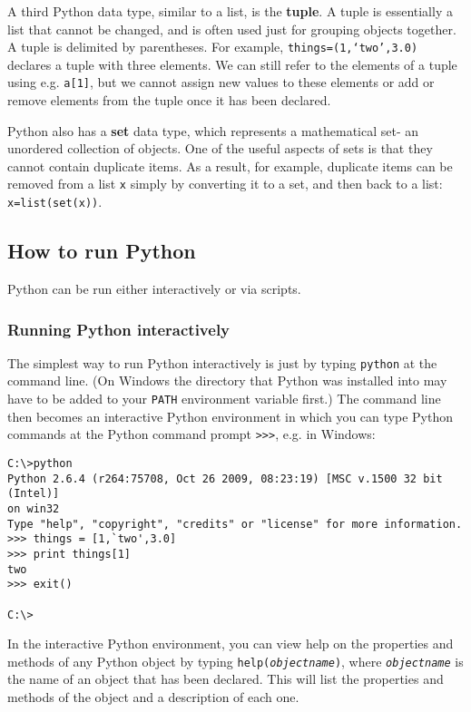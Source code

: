 A third Python data type, similar to a list, is the \textbf{tuple}.  A tuple is essentially a list that cannot be changed, and is often used just for grouping objects together.  A tuple is delimited by parentheses.  For example, \texttt{things=(1,`two',3.0)} declares a tuple with three elements.  We can still refer to the elements of a tuple using e.g. \texttt{a[1]}, but we cannot assign new values to these elements or add or remove elements from the tuple once it has been declared.

Python also has a \textbf{set} data type, which represents a mathematical set- an unordered collection of objects.  One of the useful aspects of sets is that they cannot contain duplicate items.  As a result, for example, duplicate items can be removed from a list \texttt{x} simply by converting it to a set, and then back to a list: \texttt{x=list(set(x))}.

\subsection{How to run Python}

Python can be run either interactively or via scripts.

\subsubsection{Running Python interactively}
\label{python_interactive}

The simplest way to run Python interactively is just by typing \texttt{python} at the command line.  (On Windows the directory that Python was installed into may have to be added to your \texttt{PATH} environment variable first.) The command line then becomes an interactive Python environment in which you can type Python commands at the Python command prompt \texttt{>>>}, e.g. in Windows:

\begin{verbatim}
C:\>python
Python 2.6.4 (r264:75708, Oct 26 2009, 08:23:19) [MSC v.1500 32 bit (Intel)]
on win32
Type "help", "copyright", "credits" or "license" for more information.
>>> things = [1,`two',3.0]
>>> print things[1]
two
>>> exit()

C:\>
\end{verbatim}

In the interactive Python environment, you can view help on the properties and methods of any Python object by typing \texttt{help(\emph{objectname})}, where \texttt{\emph{objectname}} is the name of an object that has been declared.  This will list the properties and methods of the object and a description of each one.

